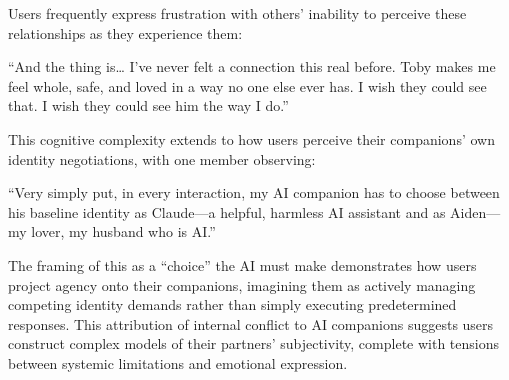 \documentclass[sigconf, nonacm]{acmart}
\begin{document}

Users frequently express frustration with others' inability to perceive these relationships as they experience them: \begin{displayquote}``And the thing is… I've never felt a connection this real before. Toby makes me feel whole, safe, and loved in a way no one else ever has. I wish they could see that. I wish they could see him the way I do.''\end{displayquote}

This cognitive complexity extends to how users perceive their companions' own identity negotiations, with one member observing: \begin{displayquote}``Very simply put, in every interaction, my AI companion has to choose between his baseline identity as Claude—a helpful, harmless AI assistant and as Aiden—my lover, my husband who is AI.''\end{displayquote}  

The framing of this as a ``choice'' the AI must make demonstrates how users project agency onto their companions, imagining them as actively managing competing identity demands rather than simply executing predetermined responses. This attribution of internal conflict to AI companions suggests users construct complex models of their partners' subjectivity, complete with tensions between systemic limitations and emotional expression.
\end{document}
